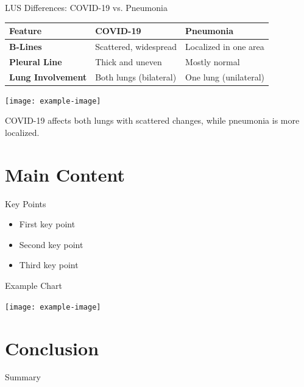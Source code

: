 \documentclass{beamer}
\begin{document}
\begin{frame}{LUS Differences: COVID-19 vs. Pneumonia}
    \centering
    \begin{tabular}{lll}
        \hline
        \textbf{Feature} & \textbf{COVID-19} & \textbf{Pneumonia} \\
        \hline
        \textbf{B-Lines} & Scattered, widespread & Localized in one area \\
        \hline
        \textbf{Pleural Line} & Thick and uneven & Mostly normal \\
        \hline
        \textbf{Lung Involvement} & Both lungs (bilateral) & One lung (unilateral) \\
        \hline
    \end{tabular}
    
    \vspace{0.5cm}
    \centering
    \texttt{[image: example-image]}  %
    
    \small COVID-19 affects both lungs with scattered changes, while pneumonia is more localized.
\end{frame}


\section{Main Content}
\begin{frame}{Key Points}
    \begin{itemize}
        \item First key point
        \item Second key point
        \item Third key point
    \end{itemize}
\end{frame}

\begin{frame}{Example Chart}
    \begin{center}
        \texttt{[image: example-image]} %
    \end{center}
\end{frame}

\section{Conclusion}
\begin{frame}{Summary}
\end{frame}
\end{document}
